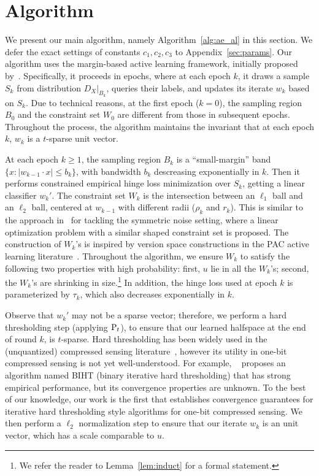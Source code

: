 \section{Algorithm}
We present our main algorithm, namely Algorithm~\ref{alg:ae_al} in this section. We defer the exact settings of constants $c_1, c_2, c_3$ to Appendix~\ref{sec:params}.
Our algorithm uses the margin-based active learning framework, initially proposed by~\cite{BBZ07}.
Specifically, it proceeds in epochs, where at each epoch $k$, it draws a sample $S_k$ from distribution $D_X|_{B_k}$, queries their labels, and updates its iterate $w_k$ based on $S_k$. Due to technical reasons, at the first epoch ($k=0$), the sampling region $B_0$ and the constraint set $W_0$ are different from those in subsequent epochs. Throughout the process, the algorithm maintains the invariant that at each epoch $k$, $w_k$ is a  $t$-sparse unit vector.

At each epoch $k \geq 1$, the sampling region $B_k$ is a ``small-margin'' band $\{x: |w_{k-1} \cdot x| \leq b_k \}$, with bandwidth $b_k$ descreasing exponentially in $k$.
Then it performs constrained empirical hinge loss minimization over $S_k$, getting a linear classifier $w_k'$.
The constraint set $W_k$ is the intersection between an $\ell_1$ ball and an $\ell_2$ ball, centered at $w_{k-1}$ with different radii ($\rho_k$ and $r_k$). This is similar to the approach in~\cite{PV13b} for tackling the symmetric noise setting, where a linear optimization problem with a similar shaped constraint set is proposed. The construction of $W_k$'s is inspired by version space constructions in the PAC active learning literature~\citep{CAL94,BBL09,H14}.
Throughout the algorithm, we ensure $W_k$ to satisfy the following two properties with high probability: first, $u$ lie in all the $W_k$'s; second, the $W_k$'s are shrinking in size.\footnote{We refer the reader to Lemma~\ref{lem:induct} for a formal statement.}
In addition, the hinge loss used at epoch $k$ is parameterized by $\tau_k$, which also decreases exponentially in $k$.

Observe that $w_k'$ may not be a sparse vector; therefore, we perform a hard thresholding step (applying $\operatorname{P}_t$), to ensure that our learned halfspace at the end of round $k$, is $t$-sparse. Hard thresholding has been widely used in the (unquantized) compressed sensing literature~\citep[See e.g.][]{BD09,GK09}, however its utility in one-bit compressed sensing is not yet well-understood. For example, ~\cite{JLBB13} proposes an algorithm named BIHT (binary iterative hard thresholding) that has strong empirical performance, but its convergence properties are unknown.
To the best of our knowledge, our work is the first that establishes convergence guarantees for iterative hard thresholding style algorithms for one-bit compressed sensing. We then perform a $\ell_2$ normalization step to ensure that our iterate $w_k$ is an unit vector, which has a scale comparable to $u$.

